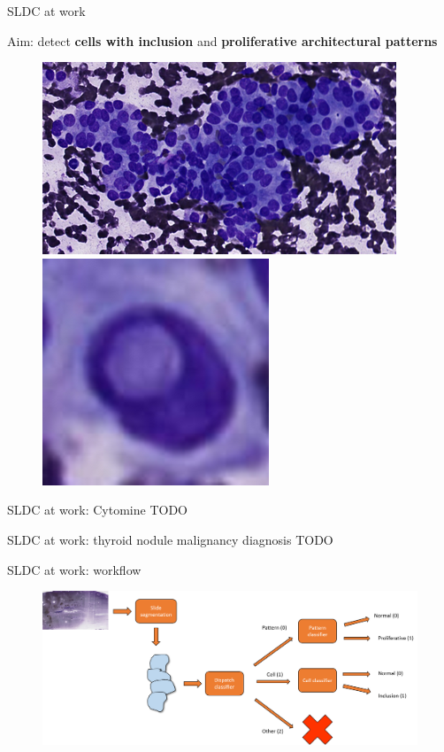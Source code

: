 \documentclass{beamer}
\begin{document}
\begin{frame}{SLDC at work}
	\begin{center}	
		Aim: detect \textbf{cells with inclusion} and \textbf{proliferative architectural patterns}
	\end{center}
	\begin{figure}
		\includegraphics[scale=0.55]{images/prolif_pattern_1.png}
		\hspace{1cm}
		\includegraphics[scale=0.35]{images/incl1.png}
	\end{figure}
\end{frame}


\begin{frame}{SLDC at work: Cytomine}
	TODO
\end{frame}

\begin{frame}{SLDC at work: thyroid nodule malignancy diagnosis}
	TODO
\end{frame}

\begin{frame}{SLDC at work: workflow}
	\begin{figure}
		\includegraphics[scale=0.35]{images/thyroid_workflow_1.png}
	\end{figure}
\end{frame}
\end{document}

